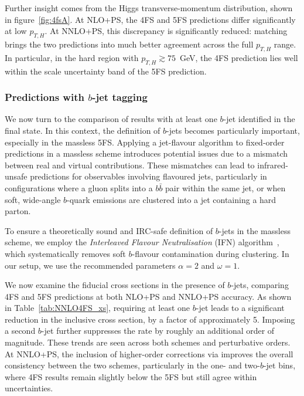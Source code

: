 \documentclass[11pt,a4paper]{article}
\begin{document}
Further insight comes from the Higgs transverse-momentum distribution, shown in figure~\ref{fig:4fsA}. At NLO+PS, the 4FS and 5FS predictions differ significantly at low \(p_{T,H}\). At NNLO+PS, this discrepancy is significantly reduced: \minnlo{} matching brings the two predictions into much better agreement across the full \(p_{T,H}\) range. In particular, in the hard region with \(p_{T,H} \gtrsim 75\)~GeV, the 4FS prediction lies well within the scale uncertainty band of the 5FS prediction.
 
\subsubsection*{Predictions with $b$-jet tagging}
We now turn to the comparison of results with at least one $b$-jet identified in the final state. In this context, the definition of $b$-jets becomes particularly important, especially in the massless 5FS. Applying a jet-flavour algorithm to fixed-order predictions in a massless scheme introduces potential issues due to a mismatch between real and virtual contributions. These mismatches can lead to infrared-unsafe predictions for observables involving flavoured jets, particularly in configurations where a gluon splits into a $b\bar{b}$ pair within the same jet, or when soft, wide-angle $b$-quark emissions are clustered into a jet containing a hard parton. 

To ensure a theoretically sound and IRC-safe definition of $b$-jets in the massless scheme, we employ the \emph{Interleaved Flavour Neutralisation} (IFN) algorithm~\cite{Caola:2023wpj}, which systematically removes soft $b$-flavour contamination during clustering. In our setup, we use the recommended parameters $\alpha = 2$ and $\omega = 1$. 

We now examine the fiducial cross sections in the presence of $b$-jets, comparing 4FS and 5FS predictions at both NLO+PS and NNLO+PS accuracy. As shown in Table~\ref{tab:NNLO4FS_xs}, requiring at least one $b$-jet leads to a significant reduction in the inclusive cross section, by a factor of approximately 5. Imposing a second $b$-jet further suppresses the rate by roughly an additional order of magnitude. These trends are seen across both schemes and perturbative orders. At NNLO+PS, the inclusion of higher-order corrections via \minnlo{} improves the overall consistency between the two schemes, particularly in the one- and two-$b$-jet bins, where 4FS results remain slightly below the 5FS but still agree within uncertainties.
\end{document}
